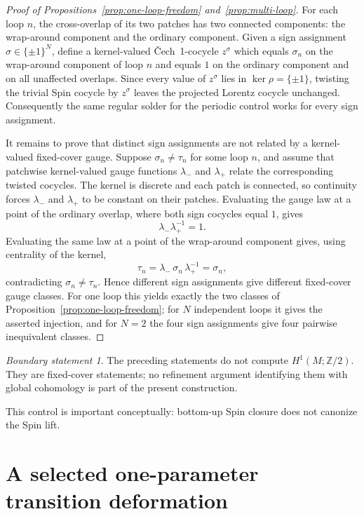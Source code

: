 \documentclass[11pt,a4paper]{article}
\theoremstyle{definition}
\theoremstyle{remark}
\newtheorem{boundary}[theorem]{Boundary statement}
\newcommand{\Ztwo}{\mathbb{Z}/2}
\newcommand{\Cech}{\ifmmode\text{\v{C}ech}\else\v{C}ech\fi}
\begin{document}
\begin{proof}[Proof of Propositions~\ref{prop:one-loop-freedom} and~\ref{prop:multi-loop}]
For each loop \(n\), the cross-overlap of its two patches has two connected
components: the wrap-around component and the ordinary component.  Given a
sign assignment \(\sigma\in\{\pm1\}^{N}\), define a kernel-valued
\Cech~1-cocycle \(z^\sigma\) which equals \(\sigma_n\) on the
wrap-around component of loop \(n\) and equals \(1\) on the ordinary
component and on all unaffected overlaps.  Since every value of
\(z^\sigma\) lies in \(\ker\rho=\{\pm1\}\), twisting the trivial Spin
cocycle by \(z^\sigma\) leaves the projected Lorentz cocycle unchanged.
Consequently the same regular solder for the periodic control works for every
sign assignment.

It remains to prove that distinct sign assignments are not related by a
kernel-valued fixed-cover gauge.  Suppose \(\sigma_n\ne\tau_n\) for some
loop \(n\), and assume that patchwise kernel-valued gauge functions
\(\lambda_-\) and \(\lambda_+\) relate the corresponding twisted
cocycles.  The kernel is discrete and each patch is connected, so continuity
forces \(\lambda_-\) and \(\lambda_+\) to be constant on their patches.
Evaluating the gauge law at a point of the ordinary overlap, where both sign
cocycles equal \(1\), gives
\[
    \lambda_-\lambda_+^{-1}=1.
\]
Evaluating the same law at a point of the wrap-around component gives, using
centrality of the kernel,
\[
    \tau_n
      =\lambda_-\,\sigma_n\,\lambda_+^{-1}
      =\sigma_n,
\]
contradicting \(\sigma_n\ne\tau_n\).  Hence different sign assignments
give different fixed-cover gauge classes.  For one loop this yields exactly
the two classes of Proposition~\ref{prop:one-loop-freedom}; for \(N\)
independent loops it gives the asserted injection, and for \(N=2\) the four
sign assignments give four pairwise inequivalent classes.
\end{proof}

\begin{boundary}
The preceding statements do not compute \(H^{1}(M;\Ztwo)\).  They are
fixed-cover statements; no refinement argument identifying them with
global cohomology is part of the present construction.
\end{boundary}

This control is important conceptually: bottom-up Spin closure does not
canonize the Spin lift.

\clearpage
\section{A selected one-parameter transition deformation}
\label{sec:deformation}
\end{document}
